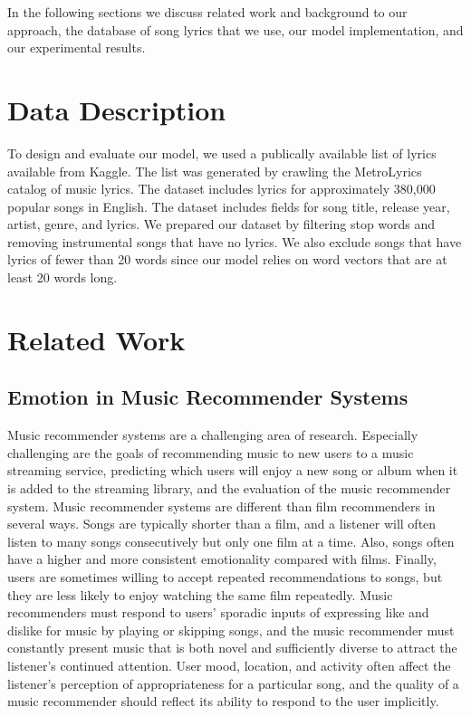 \documentclass[10pt,twocolumn]{article}
\begin{document}
In the following sections we discuss related work and background to our approach, the database of song lyrics that we use, our model implementation, and our experimental results.

\section{Data Description}
To design and evaluate our model, we used a publically available list of lyrics available from Kaggle. \cite{a14}  The list was generated by crawling the MetroLyrics catalog of music lyrics. \cite{a15}  The dataset includes lyrics for approximately 380,000 popular songs in English.  The dataset includes fields for song title, release year, artist, genre, and lyrics. We prepared our dataset by filtering stop words and removing instrumental songs that have no lyrics.  We also exclude songs that have lyrics of fewer than 20 words since our model relies on word vectors that are at least 20 words long.

\section{Related Work}
\subsection{Emotion in Music Recommender Systems}
Music recommender systems are a challenging area of research.  Especially challenging are the goals of recommending music to new users to a music streaming service, predicting which users will enjoy a new song or album when it is added to the streaming library, and the evaluation of the music recommender system. \cite{a1}  Music recommender systems are different than film recommenders in several ways.  Songs are typically shorter than a film, and a listener will often listen to many songs consecutively but only one film at a time.  Also, songs often have a higher and more consistent emotionality compared with films.  Finally, users are sometimes willing to accept repeated recommendations to songs, but they are less likely to enjoy watching the same film repeatedly.  Music recommenders must respond to users' sporadic inputs of expressing like and dislike for music by playing or skipping songs, and the music recommender must constantly present music that is both novel and sufficiently diverse to attract the listener's continued attention.  User mood, location, and activity often affect the listener's perception of appropriateness for a particular song, and the quality of a music recommender should reflect its ability to respond to the user implicitly.
\end{document}
